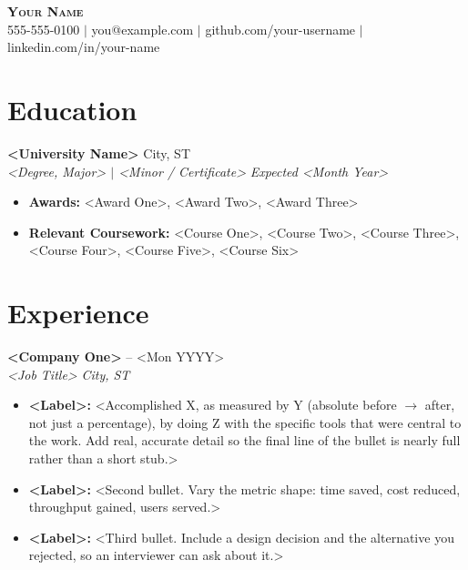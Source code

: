 \documentclass[10pt,letterpaper]{article}
\begin{document}
\begin{center}
    {\Huge \textbf{\scshape Your Name}} \\
    \vspace{2pt}
    \small 555-555-0100 $\vert$ you@example.com $\vert$ github.com/your-username $\vert$ linkedin.com/in/your-name
\end{center}
\vspace{-3pt}

\section*{Education}
\textbf{<University Name>} \hfill City, ST \\[-2pt]
\textit{<Degree, Major> $\vert$ <Minor / Certificate>} \hfill \textit{Expected <Month Year>}
\begin{itemize}[noitemsep,topsep=2pt]
    \item \textbf{Awards:} <Award One>, <Award Two>, <Award Three>
    \item \textbf{Relevant Coursework:} <Course One>, <Course Two>, <Course Three>, <Course Four>, <Course Five>, <Course Six>
\end{itemize}
\vspace{-2pt}

%

\section*{Experience}

\textbf{<Company One>}  -- <Mon YYYY> \\[-2pt]
\textit{<Job Title>} \hfill \textit{City, ST}
\begin{itemize}[noitemsep,topsep=2pt]
    \item \textbf{<Label>:} <Accomplished X, as measured by Y (absolute before $\rightarrow$ after, not just a percentage), by doing Z with the specific tools that were central to the work. Add real, accurate detail so the final line of the bullet is nearly full rather than a short stub.>
    \item \textbf{<Label>:} <Second bullet. Vary the metric shape: time saved, cost reduced, throughput gained, users served.>
    \item \textbf{<Label>:} <Third bullet. Include a design decision and the alternative you rejected, so an interviewer can ask about it.>
\end{itemize}
\end{document}
